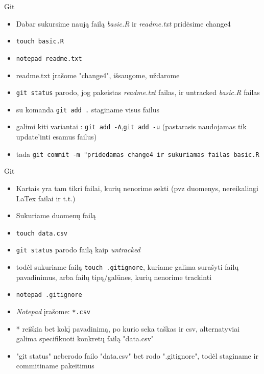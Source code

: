 \documentclass[11pt,xcolor=table]{beamer}
\begin{document}
\begin{frame}[fragile]{Git}
\begin{itemize}
\item Dabar sukursime naują failą \textit{basic.R} ir \textit{readme.txt} pridėsime change4
\item \colorbox{listinggray}{\lstinline|touch basic.R|}
\item \colorbox{listinggray}{\lstinline|notepad readme.txt|}
\item readme.txt įrašome "change4", išsaugome, uždarome
\item \colorbox{listinggray}{\lstinline|git status|} parodo, jog pakeistas \textit{readme.txt} failas, ir untracked \textit{basic.R} failas
\item su komanda \colorbox{listinggray}{\lstinline|git add .|} staginame visus failus
\item galimi kiti variantai : \colorbox{listinggray}{\lstinline|git add -A|},\colorbox{listinggray}{\lstinline|git add -u|} (pastarasis naudojamas tik update'inti esamus failus)
\item tada \colorbox{listinggray}{\lstinline|git commit -m "pridedamas change4 ir sukuriamas failas basic.R|}
\end{itemize}
\end{frame}

\begin{frame}[fragile]{Git}
\begin{itemize}
\item Kartais yra tam tikri failai, kurių nenorime sekti (pvz duomenys, nereikalingi LaTex failai ir t.t.)
\item Sukuriame duomenų failą
\item \colorbox{listinggray}{\lstinline|touch data.csv|} 
\item \colorbox{listinggray}{\lstinline|git status|} parodo failą kaip \textit{untracked}
\item todėl sukuriame failą \colorbox{listinggray}{\lstinline|touch .gitignore|}, kuriame galima surašyti failų pavadinimus, arba failų tipą/galūnes, kurių nenorime trackinti
\item \colorbox{listinggray}{\lstinline|notepad .gitignore|} 
\item \textit{Notepad} įrašome:  \colorbox{listinggray}{\lstinline|*.csv|} 
\item * reiškia bet kokį pavadinimą, po kurio seka taškas ir csv, alternatyviai galima specifikuoti konkretų failą "data.csv"
\item "git status" neberodo failo "data.csv" bet rodo ".gitignore", todėl staginame ir commitiname pakeitimus
\end{itemize}
\end{frame}
\end{document}
